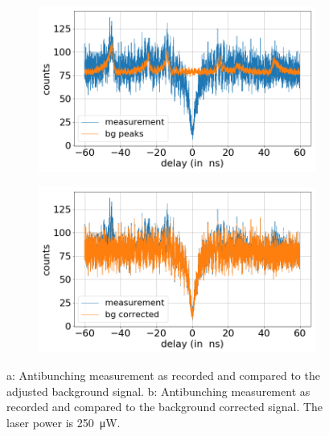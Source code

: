 \begin{figure}[H]
    \centering
    \begin{subfigure}{0.47\textwidth}
        \centering
        \includegraphics[width=1.0\textwidth]{img/output_t2/250.0muW_bg_peaks.png}
    \caption{}
    \end{subfigure}
    \begin{subfigure}{0.47\textwidth}
        \centering
        \includegraphics[width=\textwidth]{img/output_t2/250.0muW_bg_vgl.png}
        \caption{}
    \end{subfigure}
    \caption{a: Antibunching measurement as recorded and compared to the adjusted background signal. b: Antibunching measurement as recorded and compared to the background corrected signal. The laser power is \SI{250}{\micro W}.} %
\end{figure}
